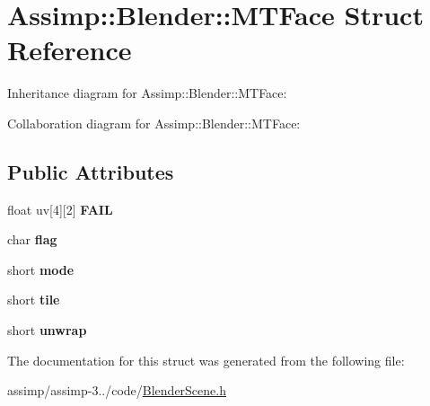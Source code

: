 \hypertarget{struct_assimp_1_1_blender_1_1_m_t_face}{\section{Assimp\+:\+:Blender\+:\+:M\+T\+Face Struct Reference}
\label{struct_assimp_1_1_blender_1_1_m_t_face}
}


Inheritance diagram for Assimp\+:\+:Blender\+:\+:M\+T\+Face\+:


Collaboration diagram for Assimp\+:\+:Blender\+:\+:M\+T\+Face\+:
\subsection*{Public Attributes}
\begin{DoxyCompactItemize}
\item 
\hypertarget{struct_assimp_1_1_blender_1_1_m_t_face_a97735f4eacf1c02f3520faaa48b29b60}{float uv\mbox{[}4\mbox{]}\mbox{[}2\mbox{]} {\bfseries F\+A\+I\+L}}\label{struct_assimp_1_1_blender_1_1_m_t_face_a97735f4eacf1c02f3520faaa48b29b60}

\item 
\hypertarget{struct_assimp_1_1_blender_1_1_m_t_face_acc7e636181498957eeda669b8d292350}{char {\bfseries flag}}\label{struct_assimp_1_1_blender_1_1_m_t_face_acc7e636181498957eeda669b8d292350}

\item 
\hypertarget{struct_assimp_1_1_blender_1_1_m_t_face_a3a4bd4399a6dc5871efab9167a717296}{short {\bfseries mode}}\label{struct_assimp_1_1_blender_1_1_m_t_face_a3a4bd4399a6dc5871efab9167a717296}

\item 
\hypertarget{struct_assimp_1_1_blender_1_1_m_t_face_a34f975de7f94f471190a1f46603a5eb0}{short {\bfseries tile}}\label{struct_assimp_1_1_blender_1_1_m_t_face_a34f975de7f94f471190a1f46603a5eb0}

\item 
\hypertarget{struct_assimp_1_1_blender_1_1_m_t_face_ab27adaa9ccf310a31c1ccb8275412e43}{short {\bfseries unwrap}}\label{struct_assimp_1_1_blender_1_1_m_t_face_ab27adaa9ccf310a31c1ccb8275412e43}

\end{DoxyCompactItemize}


The documentation for this struct was generated from the following file\+:\begin{DoxyCompactItemize}
\item 
assimp/assimp-\/3../code/\hyperlink{_blender_scene_8h}{Blender\+Scene.\+h}\end{DoxyCompactItemize}

